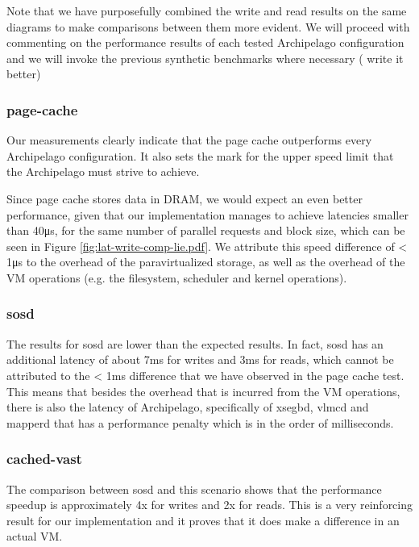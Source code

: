		
Note that we have purposefully combined the write and read results on the same 
diagrams to make comparisons between them more evident. We will proceed with 
commenting on the performance results of each tested Archipelago configuration 
and we will invoke the previous synthetic benchmarks where necessary (\fixme 
write it better)

\subsubsection{page-cache}

Our measurements clearly indicate that the page cache outperforms every 
Archipelago configuration. It also sets the mark for the upper speed limit that 
the Archipelago must strive to achieve.

Since page cache stores data in DRAM, we would expect an even better 
performance, given that our implementation manages to achieve latencies smaller
than 40μs, for the same number of parallel requests and block size, which can 
be seen in Figure \ref{fig:lat-write-comp-lie.pdf}.  We attribute this speed 
difference of < 1μs to the overhead of the paravirtualized storage, as well as 
the overhead of the VM operations (e.g. the filesystem, scheduler and kernel 
operations).

\subsubsection{sosd}

The results for sosd are lower than the expected results. In fact, sosd has an 
additional latency of about 7ms for writes and 3ms for reads, which cannot be 
attributed to the < 1ms difference that we have observed in the page cache 
test. This means that besides the overhead that is incurred from the VM 
operations, there is also the latency of Archipelago, specifically of xsegbd, 
vlmcd and mapperd that has a performance penalty which is in the order of 
milliseconds.

\subsubsection{cached-vast}

The comparison between sosd and this scenario shows that the performance 
speedup is approximately 4x for writes and 2x for reads. This is a very 
reinforcing result for our implementation and it proves that it does make a 
difference in an actual VM.

